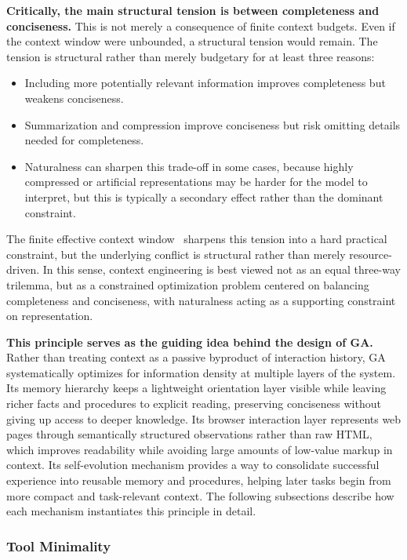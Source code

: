 \textbf{Critically, the main structural tension is between completeness and conciseness.} This is not merely a consequence of finite context budgets. Even if the context window were unbounded, a structural tension would remain. The tension is structural rather than merely budgetary for at least three reasons:
\begin{itemize}
    \item Including more potentially relevant information improves completeness but weakens conciseness.
    \item Summarization and compression improve conciseness but risk omitting details needed for completeness.
    \item Naturalness can sharpen this trade-off in some cases, because highly compressed or artificial representations may be harder for the model to interpret, but this is typically a secondary effect rather than the dominant constraint.
\end{itemize}

The finite effective context window~\citep{an2024doeseffectivecontextlength} sharpens this tension into a hard practical constraint, but the underlying conflict is structural rather than merely resource-driven. In this sense, context engineering is best viewed not as an equal three-way trilemma, but as a constrained optimization problem centered on balancing completeness and conciseness, with naturalness acting as a supporting constraint on representation.

\textbf{This principle serves as the guiding idea behind the design of GA.} Rather than treating context as a passive byproduct of interaction history, GA systematically optimizes for information density at multiple layers of the system. Its memory hierarchy keeps a lightweight orientation layer visible while leaving richer facts and procedures to explicit reading, preserving conciseness without giving up access to deeper knowledge. Its browser interaction layer represents web pages through semantically structured observations rather than raw HTML, which improves readability while avoiding large amounts of low-value markup in context. Its self-evolution mechanism provides a way to consolidate successful experience into reusable memory and procedures, helping later tasks begin from more compact and task-relevant context. The following subsections describe how each mechanism instantiates this principle in detail.

\subsubsection{Tool Minimality}


